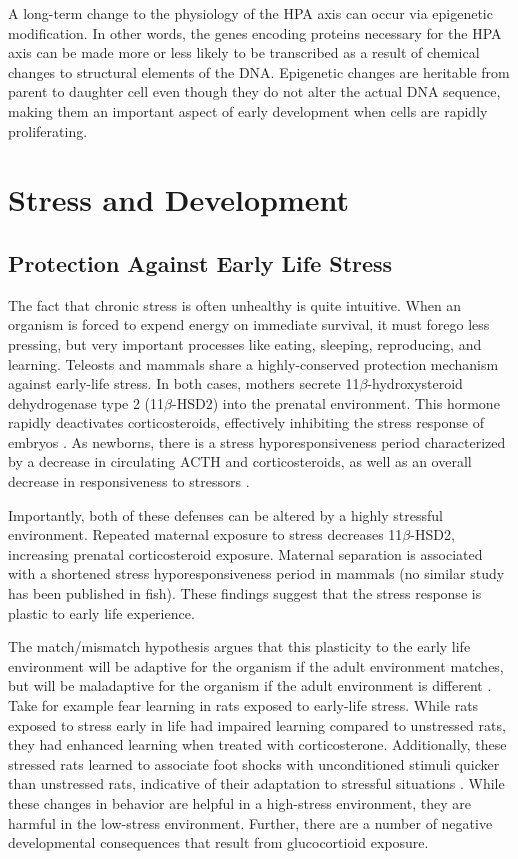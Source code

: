 \documentclass[12pt,twoside]{reedthesis}
\begin{document}
A long-term change to the physiology of the HPA axis can occur via epigenetic
modification. In other words, the genes encoding proteins necessary for the HPA
axis can be made more or less likely to be transcribed as a result of chemical
changes to structural elements of the DNA. Epigenetic changes are heritable from
parent to daughter cell
even though they do not alter the actual DNA sequence, making them an important aspect of early development when cells are rapidly proliferating. 

\section{Stress and Development}
\subsection{Protection Against Early Life Stress} 
The fact that chronic stress is often unhealthy is quite intuitive. When an
organism is forced to expend energy on immediate survival, it must forego less
pressing, but very important processes like eating, sleeping, reproducing, and
learning. Teleosts and mammals share a highly-conserved protection mechanism against
early-life stress. In both cases, mothers secrete 11$\beta$-hydroxysteroid
dehydrogenase type 2 (11$\beta$-HSD2) into the prenatal environment. This hormone rapidly deactivates corticosteroids, effectively
inhibiting the stress response of embryos \citep{van_bodegom_modulation_2017, faught_maternal_2016}. As
newborns, there is a stress hyporesponsiveness period characterized by a
decrease in circulating ACTH and corticosteroids, as well as an overall decrease
in responsiveness to stressors \citep{van_bodegom_modulation_2017, barry_ontogeny_1995}.

Importantly, both of these defenses can be altered by a highly stressful
environment. Repeated maternal exposure to stress decreases 11$\beta$-HSD2,
increasing prenatal corticosteroid exposure. Maternal separation is
associated with a shortened stress hyporesponsiveness period in mammals (no
similar study has been published in fish). These findings suggest that the stress
response is plastic to early life experience.

The match/mismatch hypothesis
argues that this plasticity to the early life environment will be adaptive for
the organism if the adult environment matches, but will be maladaptive for the
organism if the adult environment is different \citep{gluckman_early_2007}. Take
for example fear learning in rats exposed to early-life stress. While rats
exposed to stress early in life had impaired learning compared to unstressed rats,
they had enhanced learning when treated with corticosterone. Additionally, these
stressed rats learned to associate foot shocks with unconditioned
stimuli quicker than unstressed rats, indicative of their adaptation to
stressful situations \citep{champagne_maternal_2008}. While these changes in
behavior are helpful in a high-stress environment, they are
harmful in the low-stress environment. Further, there
 are a number of negative developmental consequences that result from glucocortioid exposure.   
\end{document}

